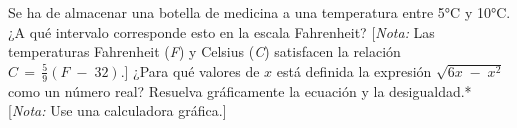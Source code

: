 \documentclass{exam}[letterpaper,10pt]
\begin{document}
\begin{multicols}{2}
\begin{questions}
    \question \textnormal{Se ha de almacenar una botella de medicina a una temperatura entre 5°C y 10°C. ¿A qu\'e intervalo corresponde esto en la escala Fahrenheit? [\emph{Nota:} Las temperaturas Fahrenheit (\emph{F}) y Celsius (\emph{C}) satisfacen la relaci\'on \(C\,=\,\frac{5}{9}(F\;-\;32)\).]}
    \question \textnormal{¿Para qu\'e valores de \(x\) est\'a definida la expresi\'on \(\sqrt{6x\;-\;x^2}\) como un n\'umero real?}
    \question \textnormal{Resuelva gr\'aficamente la ecuaci\'on y la desigualdad.* [\emph{Nota:} Use una calculadora gr\'afica.]}
    \question
    \question
\end{questions}
\end{multicols}
\end{document}
